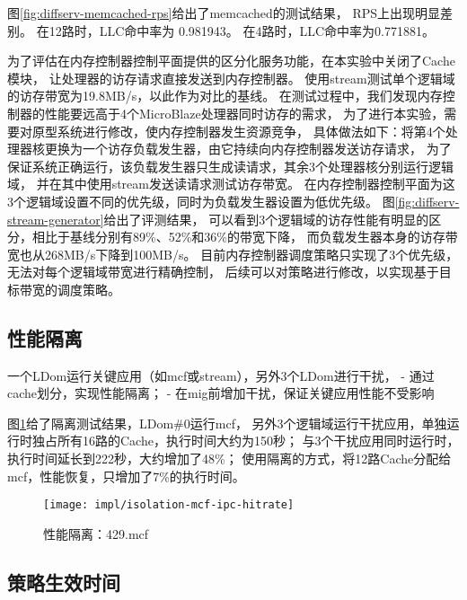 图\ref{fig:diffserv-memcached-rps}给出了memcached的测试结果，
RPS上出现明显差别。
在12路时，LLC命中率为 0.981943。
在4路时，LLC命中率为0.771881。

为了评估在内存控制器控制平面提供的区分化服务功能，在本实验中关闭了Cache模块，
让处理器的访存请求直接发送到内存控制器。
使用stream测试单个逻辑域的访存带宽为19.8MB/s，以此作为对比的基线。
在测试过程中，我们发现内存控制器的性能要远高于4个MicroBlaze处理器同时访存的需求，
为了进行本实验，需要对原型系统进行修改，使内存控制器发生资源竞争，
具体做法如下：将第4个处理器核更换为一个访存负载发生器，由它持续向内存控制器发送访存请求，
为了保证系统正确运行，该负载发生器只生成读请求，其余3个处理器核分别运行逻辑域，
并在其中使用stream发送读请求测试访存带宽。
在内存控制器控制平面为这3个逻辑域设置不同的优先级，同时为负载发生器设置为低优先级。
图\ref{fig:diffserv-stream-generator}给出了评测结果，
可以看到3个逻辑域的访存性能有明显的区分，相比于基线分别有89\%、52\%和36\%的带宽下降，
而负载发生器本身的访存带宽也从268MB/s下降到100MB/s。
目前内存控制器调度策略只实现了3个优先级，无法对每个逻辑域带宽进行精确控制，
后续可以对策略进行修改，以实现基于目标带宽的调度策略。



\subsection{性能隔离}

一个LDom运行关键应用（如mcf或stream），另外3个LDom进行干扰，
 - 通过cache划分，实现性能隔离；
 - 在mig前增加干扰，保证关键应用性能不受影响

图\ref{fig:isolation-mcf-ipc-hitrate}给了隔离测试结果，LDom\#0运行mcf，
另外3个逻辑域运行干扰应用，单独运行时独占所有16路的Cache，执行时间大约为150秒；
与3个干扰应用同时运行时，执行时间延长到222秒，大约增加了48\%；
使用隔离的方式，将12路Cache分配给mcf，性能恢复，只增加了7\%的执行时间。

\begin{figure}[tb]
  \centering
  \texttt{[image: impl/isolation-mcf-ipc-hitrate]}
  \caption{性能隔离：429.mcf}
  \label{fig:isolation-mcf-ipc-hitrate}
\end{figure}


\subsection{策略生效时间}
\label{chap:impl:trigger-latency}

